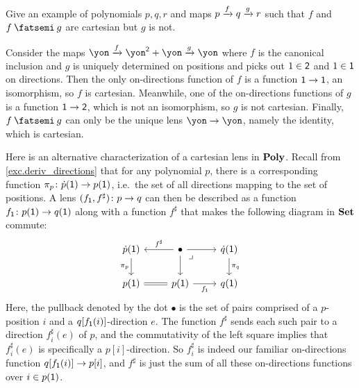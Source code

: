 \documentclass[Book-Poly]{subfiles}
\begin{document}
\begin{exercise}
Give an example of polynomials $p,q,r$ and maps $p\xrightarrow{f}q\xrightarrow{g}r$ such that $f$ and $f \then g$ are cartesian but $g$ is not.
\begin{solution}
Consider the maps $\yon \To{f} \yon^\2 + \yon \To{g} \yon$ where $f$ is the canonical inclusion and $g$ is uniquely determined on positions and picks out $1 \in \textsf{2}$ and $1 \in \textsf{1}$ on directions.
Then the only on-directions function of $f$ is a function $\textsf{1} \to \textsf{1}$, an isomorphism, so $f$ is cartesian.
Meanwhile, one of the on-directions functions of $g$ is a function $\textsf{1} \to \textsf{2}$, which is not an isomorphism, so $g$ is not cartesian.
Finally, $f \then g$ can only be the unique lens $\yon \to \yon$, namely the identity, which is cartesian.
\end{solution}
\end{exercise}

Here is an alternative characterization of a cartesian lens in $\mathbf{Poly}$.
Recall from \cref{exc.deriv_directions} that for any polynomial $p$, there is a corresponding function $\pi_p\colon\dot{p}(\textsf{1})\to p(\textsf{1})$, i.e.\ the set of all directions mapping to the set of positions.
A lens $(f_{\textsf{1}},f^\sharp)\colon p\to q$ can then be described as a function $f_{\textsf{1}}\colon p(\textsf{1})\to q(\textsf{1})$ along with a function $f^\sharp$ that makes the following diagram in $\mathbf{Set}$ commute:
\begin{equation}\label{eqn.poly_map_usu}
\begin{tikzcd}
	\dot{p}(\1)\ar[d, "\pi_p"']&
	\bullet\ar[l, "f^\sharp"']\ar[r]\ar[d]&
	\dot{q}(\1)\ar[d, "\pi_q"]\\
	p(\1)\ar[r, equal]&
	p(\1)\ar[r, "f_\1"']&
	q(\1)\ar[ul, phantom, very near end, "\lrcorner"]
\end{tikzcd}
\end{equation}
Here, the pullback denoted by the dot $\bullet$ is the set of pairs comprised of a $p$-position $i$ and a $q[f_{\textsf{1}}(i)]$-direction $e$.
The function $f^\sharp$ sends each such pair to a direction $f^\sharp_i(e)$ of $p$, and the commutativity of the left square implies that $f^\sharp_i(e)$ is specifically a $p[i]$-direction.
So $f^\sharp_i$ is indeed our familiar on-directions function $q[f_{\textsf{1}}(i)]\to p[i]$, and $f^\sharp$ is just the sum of all these on-directions functions over $i\in p(\textsf{1})$.
\end{document}
